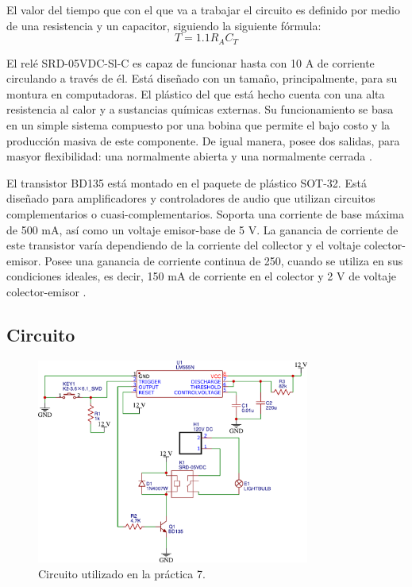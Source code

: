 El valor del tiempo que con el que va a trabajar el circuito es definido por medio de una resistencia y un capacitor, siguiendo la siguiente fórmula:
\begin{equation}
    T = 1.1 R_A C_T
    \label{Eq: ecuacion calculo del tiempo}
\end{equation}

El relé SRD-05VDC-Sl-C es  capaz de funcionar hasta con 10 A de corriente circulando a través de él. Está diseñado con un tamaño, principalmente, para su montura en computadoras. El plástico del que está hecho cuenta con una alta resistencia al calor y a sustancias químicas externas. Su funcionamiento se basa en un simple sistema compuesto por una bobina que permite el bajo costo y la producción masiva de este componente. De igual manera, posee dos salidas, para masyor flexibilidad: una normalmente abierta y una normalmente cerrada \parencite{alldatasheet_srd-05vdc-sl-c_nodate}.

El transistor BD135 está montado en el paquete de plástico SOT-32. Está diseñado para amplificadores y controladores de audio que utilizan circuitos complementarios o cuasi-complementarios. Soporta una corriente de base máxima de 500 mA, así como un voltaje emisor-base de 5 V. La ganancia de corriente de este transistor varía dependiendo de la corriente del collector y el voltaje colector-emisor. Posee una ganancia de corriente continua de 250, cuando se utiliza en sus condiciones ideales, es decir, 150 mA de corriente en el colector y 2 V de voltaje colector-emisor \parencite{stmicroelectronics_bd135_nodate}.

\subsection{Circuito}

\begin{figure}[htb]
    \centering
    \includegraphics[width=0.8\textwidth]{media/circuito_07}
    \caption{Circuito utilizado en la práctica 7.}
    \label{Fig: Circuito utilizado en la practica 7}
\end{figure}

